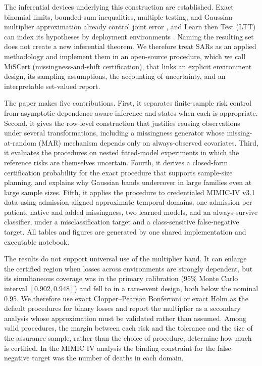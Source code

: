 \documentclass[twoside,11pt]{article}
\newcommand{\method}{MiSCert}
\begin{document}


The inferential devices underlying this construction are established. Exact binomial limits,
bounded-sum inequalities, multiple testing, and Gaussian multiplier approximation already
control joint error \citep{clopper1934,hoeffding1963,holm1979,chernozhukov2013gaussian}, and
Learn then Test (LTT) can index its hypotheses by deployment environments
\citep{angelopoulos2025ltt}. Naming the resulting set does not create a new inferential
theorem. We therefore treat SARs as an applied methodology and implement them in an
open-source procedure, which we call \method{} (missingness-and-shift certification), that
links an explicit environment design, its sampling assumptions, the accounting of
uncertainty, and an interpretable set-valued report.

The paper makes five contributions. First, it separates finite-sample risk control from
asymptotic dependence-aware inference and states when each is appropriate. Second, it gives
the row-level construction that justifies reusing observations under several
transformations, including a missingness generator whose missing-at-random (MAR) mechanism
depends only on always-observed covariates. Third, it evaluates the procedures on nested
fitted-model experiments in which the reference risks are themselves uncertain. Fourth, it
derives a closed-form certification probability for the exact procedure that supports
sample-size planning, and explains why Gaussian bands undercover in large families even at
large sample sizes. Fifth, it applies the procedure to credentialed MIMIC-IV v3.1 data using
admission-aligned approximate temporal domains, one admission per patient, native and added
missingness, two learned models, and an always-survive classifier, under a misclassification
target and a class-sensitive false-negative target. All tables and figures are generated by
one shared implementation and executable notebook.

The results do not support universal use of the multiplier band. It can enlarge the
certified region when losses across environments are strongly dependent, but its
simultaneous coverage was \CalMultCoverage{} in the primary calibration (95\% Monte Carlo
interval $[0.902,0.948]$) and fell to \RareMultCoverage{} in a rare-event design, both below
the nominal 0.95. We therefore use exact Clopper--Pearson Bonferroni or exact Holm as the
default procedures for binary losses and report the multiplier as a secondary analysis whose
approximation must be validated rather than assumed. Among valid procedures, the margin
between each risk and the tolerance and the size of the assurance sample, rather than the
choice of procedure, determine how much is certified. In the MIMIC-IV analysis the binding
constraint for the false-negative target was the number of deaths in each domain.
\end{document}

